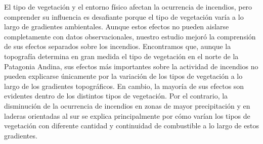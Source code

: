 El tipo de vegetación y el entorno físico afectan la ocurrencia de incendios, pero comprender su influencia es desafiante porque el tipo de vegetación varía a lo largo de gradientes ambientales. Aunque estos efectos no pueden aislarse completamente con datos observacionales, nuestro estudio mejoró la comprensión de sus efectos separados sobre los incendios. Encontramos que, aunque la topografía determina en gran medida el tipo de vegetación en el norte de la Patagonia Andina, sus efectos más importantes sobre la actividad de incendios no pueden explicarse únicamente por la variación de los tipos de vegetación a lo largo de los gradientes topográficos. En cambio, la mayoría de sus efectos son evidentes dentro de los distintos tipos de vegetación. Por el contrario, la disminución de la ocurrencia de incendios en zonas de mayor precipitación y en laderas orientadas al sur se explica principalmente por cómo varían los tipos de vegetación con diferente cantidad y continuidad de combustible a lo largo de estos gradientes.

